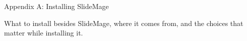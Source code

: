 
\begin{sectionframe}{Appendix A: Installing SlideMage}
	\begin{minipage}{0.9\linewidth}\small
		What to install besides SlideMage, where it comes from, and the choices that matter while installing it.
	\end{minipage}\par\medskip
	\SMChapterAgenda
	\medskip
	\hyperlink{1f8}{}
\end{sectionframe}
